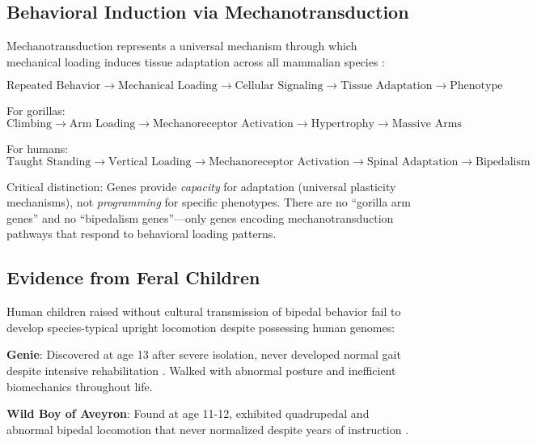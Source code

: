 \documentclass[12pt,a4paper]{article}
\begin{document}
\subsection{Behavioral Induction via Mechanotransduction}

Mechanotransduction represents a universal mechanism through which mechanical loading induces tissue adaptation across all mammalian species \citep{ingber2006cellular}:

\begin{equation}
\text{Repeated Behavior} \rightarrow \text{Mechanical Loading} \rightarrow \text{Cellular Signaling} \rightarrow \text{Tissue Adaptation} \rightarrow \text{Phenotype}
\end{equation}

For gorillas:
\begin{equation}
\text{Climbing} \rightarrow \text{Arm Loading} \rightarrow \text{Mechanoreceptor Activation} \rightarrow \text{Hypertrophy} \rightarrow \text{Massive Arms}
\end{equation}

For humans:
\begin{equation}
\text{Taught Standing} \rightarrow \text{Vertical Loading} \rightarrow \text{Mechanoreceptor Activation} \rightarrow \text{Spinal Adaptation} \rightarrow \text{Bipedalism}
\end{equation}

Critical distinction: Genes provide \textit{capacity} for adaptation (universal plasticity mechanisms), not \textit{programming} for specific phenotypes. There are no ``gorilla arm genes'' and no ``bipedalism genes''—only genes encoding mechanotransduction pathways that respond to behavioral loading patterns.

\subsection{Evidence from Feral Children}

Human children raised without cultural transmission of bipedal behavior fail to develop species-typical upright locomotion despite possessing human genomes:

\textbf{Genie}: Discovered at age 13 after severe isolation, never developed normal gait despite intensive rehabilitation \citep{curtiss1977genie}. Walked with abnormal posture and inefficient biomechanics throughout life.

\textbf{Wild Boy of Aveyron}: Found at age 11-12, exhibited quadrupedal and abnormal bipedal locomotion that never normalized despite years of instruction \citep{lane1976wild}.
\end{document}
